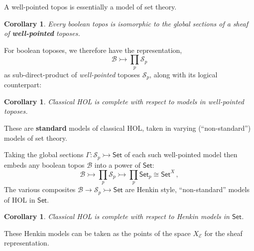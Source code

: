 \documentclass[11pt]{article}
\newcommand{\E}{\ensuremath{\mathcal{E}}}
\newcommand{\Set}{\ensuremath{\mathsf{Set}}}
\newtheorem{corollary}[theorem]{Corollary}
\theoremstyle{remark}
\theoremstyle{definition}
\newcommand{\myemph}[1]{\textbf{#1}}
\begin{document}
A well-pointed topos is essentially a model of set theory.  

\begin{corollary}
Every boolean topos is isomorphic to the global sections of a sheaf of \myemph{well-pointed} toposes.  
\end{corollary}


For boolean toposes, we therefore have the  representation, 
\[
\mathcal{B} \rightarrowtail \prod_{p}\mathcal{S}_p 
\]
as sub-direct-product of \emph{well-pointed} toposes $\mathcal{S}_p$, along with its logical counterpart:
%
\begin{corollary}
Classical HOL is complete with respect to models in well-pointed toposes.
\end{corollary}
\medskip

These are \myemph{standard} models of classical HOL, taken in varying (``non-standard'') models of set theory.



Taking the global sections $\Gamma:\mathcal{S}_p \rightarrowtail \Set$ of each such well-pointed model then embeds any boolean topos $\mathcal{B}$ into a power of $\Set$:
\[
\mathcal{B} \rightarrowtail \prod_{p}\mathcal{S}_p \rightarrowtail \prod_{p}\Set_p \cong \Set^X\,,
\]
The various composites $\mathcal{B} \rightarrow \mathcal{S}_p \rightarrowtail \Set$ are Henkin style, ``non-standard'' models of HOL in $\Set$.

\begin{corollary}
Classical HOL is complete with respect to Henkin models in $\Set$.
\end{corollary}
\medskip

These Henkin models can be taken as the points of the space $X_\E$ for the sheaf representation.
\end{document}
